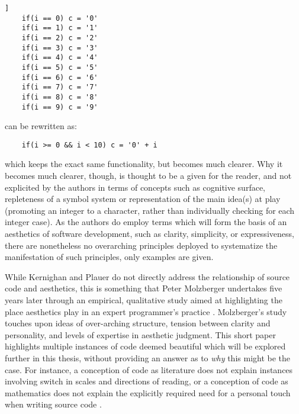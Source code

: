 \begin{lstlisting}]
    if(i == 0) c = '0'
    if(i == 1) c = '1'
    if(i == 2) c = '2'
    if(i == 3) c = '3'
    if(i == 4) c = '4'
    if(i == 5) c = '5'
    if(i == 6) c = '6'
    if(i == 7) c = '7'
    if(i == 8) c = '8'
    if(i == 9) c = '9'
\end{lstlisting}

can be rewritten as:

\begin{lstlisting}
    if(i >= 0 && i < 10) c = '0' + i
\end{lstlisting}

which keeps the exact same functionality, but becomes much clearer. Why it becomes much clearer, though, is thought to be a given for the reader, and not explicited by the authors in terms of concepts such as cognitive surface, repleteness of a symbol system or representation of the main idea(s) at play (promoting an integer to a character, rather than individually checking for each integer case). As the authors do employ terms which will form the basis of an aesthetics of software development, such as clarity, simplicity, or expressiveness, there are nonetheless no overarching principles deployed to systematize the manifestation of such principles, only examples are given.

While Kernighan and Plauer do not directly address the relationship of source code and aesthetics, this is something that Peter Molzberger undertakes five years later through an empirical, qualitative study aimed at highlighting the place aesthetics play in an expert programmer's practice \citep{molzberger_aesthetics_1983}. Molzberger's study touches upon ideas of over-arching structure, tension between clarity and personality, and levels of expertise in aesthetic judgment. This short paper highlights multiple instances of code deemed beautiful which will be explored further in this thesis, without providing an answer as to \emph{why} this might be the case. For instance, a conception of code as literature does not explain instances involving switch in scales and directions of reading, or a conception of code as mathematics does not explain the explicitly required need for a personal touch when writing source code \citep{molzberger_aesthetics_1983}.

